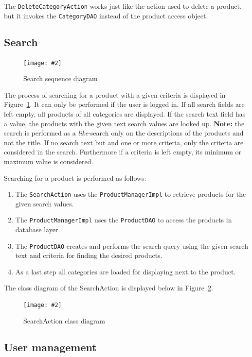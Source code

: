 \documentclass[11pt]{article}
\newcommand{\cgraphic}[3]
{
	\begin{figure}[htb]
		\begin{center}
		\texttt{[image: \#2]}
		\end{center}
		\caption{#3}
		\label{fig:#2}
	\end{figure}
}%
\begin{document}
	The \texttt{DeleteCategoryAction} works just like the action used to delete a product, but it invokes the \texttt{CategoryDAO} instead of the product access object.
    
    \subsection{Search} %
    \cgraphic{.5}{searchAction-seq}{Search sequence diagram}
    The process of searching for a product with a given criteria is displayed in Figure~\ref{fig:searchAction-seq}. It can only be performed if the user is logged in. If all search fields are left empty, all products of all categories are displayed. If the search text field has a value, the products with the given text search values are looked up. \textbf{Note:} the search is performed as a \textit{like}-search only on the descriptions of the products and not the title. If no search text but and one or more criteria, only the criteria are considered in the search. Furthermore if a criteria is left empty, its minimum or maximum value is considered.
    
   Searching for a product is performed as follows: 
   \begin{enumerate}
   	\item The \texttt{SearchAction} uses the \texttt{ProductManagerImpl} to retrieve products for the given search values.
   	\item The \texttt{ProductManagerImpl} uses the \texttt{ProductDAO} to access the products in database layer.
   	\item The \texttt{ProductDAO} creates and performs the search query using the given search text and criteria for finding the desired products.
   	\item As a last step all categories are loaded for displaying next to the product.
   \end{enumerate}
   
   The class diagram of the SearchAction is displayed below in Figure~\ref{fig:searchAction-class}.
   \cgraphic{.5}{searchAction-class}{SearchAction class diagram}  
   
   \subsection{User management} %
      
      
\end{document}
